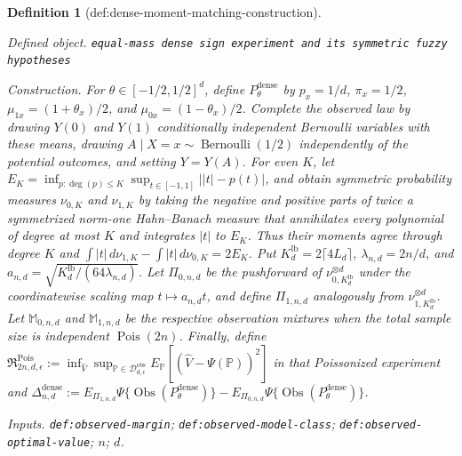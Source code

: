 \documentclass{article}
\newtheorem{definition}{Definition}
\begin{document}
\begin{definition}[def:dense-moment-matching-construction]\label{def:dense-moment-matching-construction}
\par\smallskip\noindent\emph{Defined object.} \texttt{equal-\allowbreak{}mass dense sign experiment and its symmetric fuzzy hypotheses}
\par\smallskip\noindent\emph{Construction.} For \(\theta\in[-1/2,1/2]^d\), define \(P_\theta^{\mathrm{dense}}\) by \(p_x=1/d\), \(\pi_x=1/2\), \(\mu_{1x}=(1+\theta_x)/2\), and \(\mu_{0x}=(1-\theta_x)/2\). Complete the observed law by drawing \(Y(0)\) and \(Y(1)\) conditionally independent Bernoulli variables with these means, drawing \(A\mid X=x\sim\operatorname{Bernoulli}(1/2)\) independently of the potential outcomes, and setting \(Y=Y(A)\). For even \(K\), let \(E_K=\inf_{p:\deg(p)\leq K}\sup_{t\in[-1,1]}\lvert\lvert t\rvert-p(t)\rvert\), and obtain symmetric probability measures \(\nu_{0,K}\) and \(\nu_{1,K}\) by taking the negative and positive parts of twice a symmetrized norm-one Hahn--Banach measure that annihilates every polynomial of degree at most \(K\) and integrates \(\lvert t\rvert\) to \(E_K\). Thus their moments agree through degree \(K\) and \(\int\lvert t\rvert\,d\nu_{1,K}-\int\lvert t\rvert\,d\nu_{0,K}=2E_K\). Put \(K_d^{\mathrm{lb}}=2\lceil4L_d\rceil\), \(\lambda_{n,d}=2n/d\), and \(a_{n,d}=\sqrt{K_d^{\mathrm{lb}}/(64\lambda_{n,d})}\). Let \(\Pi_{0,n,d}\) be the pushforward of \(\nu_{0,K_d^{\mathrm{lb}}}^{\otimes d}\) under the coordinatewise scaling map \(t\mapsto a_{n,d}t\), and define \(\Pi_{1,n,d}\) analogously from \(\nu_{1,K_d^{\mathrm{lb}}}^{\otimes d}\). Let \(\mathbb M_{0,n,d}\) and \(\mathbb M_{1,n,d}\) be the respective observation mixtures when the total sample size is independent \(\operatorname{Pois}(2n)\). Finally, define \(\mathfrak R^{\mathrm{Pois}}_{2n,d,\epsilon}:=\inf_{\widehat V}\sup_{\mathbb P\in\mathcal D_{d,\epsilon}^{\mathrm{obs}}}E_{\mathbb P}[(\widehat V-\Psi(\mathbb P))^2]\) in that Poissonized experiment and \(\Delta_{n,d}^{\mathrm{dense}}:=E_{\Pi_{1,n,d}}\Psi\{\operatorname{Obs}(P_\theta^{\mathrm{dense}})\}-E_{\Pi_{0,n,d}}\Psi\{\operatorname{Obs}(P_\theta^{\mathrm{dense}})\}\).
\par\smallskip\noindent\emph{Inputs.} \texttt{def:\allowbreak{}observed-\allowbreak{}margin}; \texttt{def:\allowbreak{}observed-\allowbreak{}model-\allowbreak{}class}; \texttt{def:\allowbreak{}observed-\allowbreak{}optimal-\allowbreak{}value}; \(n\); \(d\).
\end{definition}
\end{document}
